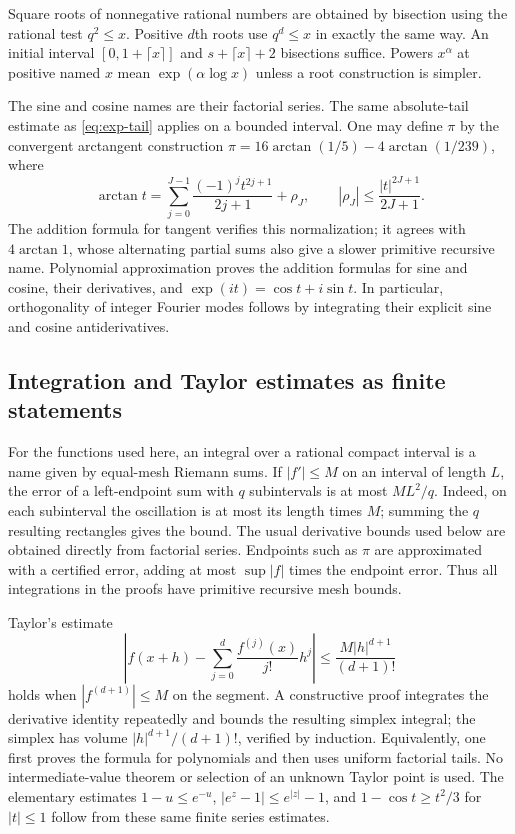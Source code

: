 Square roots of nonnegative rational numbers are obtained by bisection using
the rational test $q^2\le x$.  Positive $d$th roots use $q^d\le x$ in exactly the
same way.  An initial interval $[0,1+\lceil x\rceil]$ and
$s+\lceil x\rceil+2$ bisections suffice.  Powers $x^\alpha$ at positive named
$x$ mean $\exp(\alpha\log x)$ unless a root construction is simpler.

The sine and cosine names are their factorial series.  The same absolute-tail
estimate as \eqref{eq:exp-tail} applies on a bounded interval.  One may define
$\pi$ by the convergent arctangent construction
$\pi=16\arctan(1/5)-4\arctan(1/239)$, where
\[
 \arctan t=\sum_{j=0}^{J-1}\frac{(-1)^j t^{2j+1}}{2j+1}
             +\rho_J,\qquad |\rho_J|\le\frac{|t|^{2J+1}}{2J+1}.
\]
The addition formula for tangent verifies this normalization; it agrees with
$4\arctan1$, whose alternating partial sums also give a slower primitive
recursive name.  Polynomial approximation proves the addition formulas for
sine and cosine, their derivatives, and $\exp(it)=\cos t+i\sin t$.
In particular, orthogonality of integer Fourier modes follows by integrating
their explicit sine and cosine antiderivatives.

\subsection{Integration and Taylor estimates as finite statements}

For the functions used here, an integral over a rational compact interval is a
name given by equal-mesh Riemann sums.  If $|f'|\le M$ on an interval of length
$L$, the error of a left-endpoint sum with $q$ subintervals is at most
$ML^2/q$.  Indeed, on each subinterval the oscillation is at most its length
times $M$; summing the $q$ resulting rectangles gives the bound.  The usual
derivative bounds used below are obtained directly from factorial series.
Endpoints such as $\pi$ are approximated with a certified error, adding at most
$\sup|f|$ times the endpoint error.  Thus all integrations in the proofs have
primitive recursive mesh bounds.

Taylor's estimate
\begin{equation}\label{eq:taylor-estimate}
 \left|f(x+h)-\sum_{j=0}^{d}\frac{f^{(j)}(x)}{j!}h^j\right|
 \le\frac{M|h|^{d+1}}{(d+1)!}
\end{equation}
holds when $|f^{(d+1)}|\le M$ on the segment.  A constructive proof integrates
the derivative identity repeatedly and bounds the resulting simplex integral;
the simplex has volume $|h|^{d+1}/(d+1)!$, verified by induction.  Equivalently,
one first proves the formula for polynomials and then uses uniform factorial
tails.  No intermediate-value theorem or selection of an unknown Taylor point
is used.  The elementary estimates $1-u\le e^{-u}$,
$|e^z-1|\le e^{|z|}-1$, and $1-\cos t\ge t^2/3$ for $|t|\le1$ follow from
these same finite series estimates.

